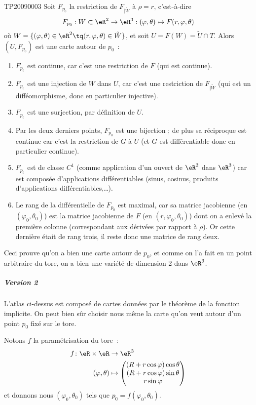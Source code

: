 \begin{corrige}{TP20090003}
Soit $F_{p_0}$ la restriction de $F_{| \tilde W}$ à $\rho = r$, c'est-à-dire
\begin{equation*}
  F_{p_0} : W \subset \eR^2 \to \eR^3 : (\varphi,\theta) \mapsto F(r,\varphi,\theta)
\end{equation*}
où $W = \{ (\varphi,\theta) \in \eR^2 \tq (r,\varphi,\theta) \in \tilde
W\}$, et soit $U = F(W) = \tilde U \cap T$. Alors $(U, F_{p_0})$ est
une carte autour de $p_0$~:
\begin{enumerate}
\item $F_{p_0}$ est continue, car c'est une restriction de $F$ (qui est
  continue).
\item $F_{p_0}$ est une injection de $W$ dans $U$, car c'est une
  restriction de $F_{| \tilde W}$ (qui est un difféomorphisme,
  donc en particulier injective).
\item $F_{p_0}$ est une surjection, par définition de $U$.
\item Par les deux derniers points, $F_{p_0}$ est une bijection ; de
  plus sa réciproque est continue car c'est la restriction de $G$ à
  $U$ (et $G$ est différentiable donc en particulier continue).
\item $F_{p_0}$ est de classe $C^1$ (comme application d'un ouvert de
  $\eR^2$ dans $\eR^3$) car est composée d'applications
  différentiables (sinus, cosinus, produits d'applications
  différentiables,\dots).
\item Le rang de la différentielle de $F_{p_0}$ est maximal, car sa
  matrice jacobienne (en $(\varphi_0,\theta_0)$) est la matrice jacobienne de $F$
  (en $(r,\varphi_0,\theta_0)$) dont on a enlevé la première colonne
  (correspondant aux dérivées par rapport à $\rho$). Or cette dernière
  était de rang trois, il reste donc une matrice de rang deux.
\end{enumerate}

Ceci prouve qu'on a bien une carte autour de $p_0$, et comme on l'a
fait en un point arbitraire du tore, on a bien une variété de
dimension $2$ dans $\eR^3$.

\subparagraph{Version 2} L'atlas ci-dessus est composé de cartes
données par le théorème de la fonction implicite. On peut bien sûr
choisir nous même la carte qu'on veut autour d'un point $p_0$ fixé sur
le tore.

Notons $f$ la paramétrisation du tore~:
\begin{equation}
	\begin{aligned}
		f\colon \eR\times\eR&\to \eR^3 \\
		(\varphi,\theta)&\mapsto \begin{pmatrix}
			(R+r\cos\varphi)\cos\theta	\\ 
			(R+r\cos\varphi)\sin\theta	\\ 
			r\sin\varphi	
		\end{pmatrix}
	\end{aligned}
\end{equation}
et donnons nous $(\varphi_0,\theta_0)$ tels que $p_0 =
f(\varphi_0,\theta_0)$.


\end{corrige}
